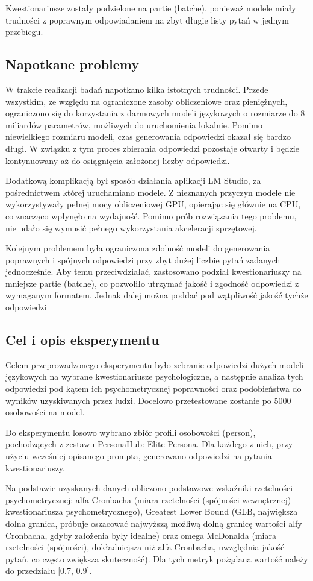 \documentclass{article}
\begin{document}
Kwestionariusze zostały podzielone na partie (batche), ponieważ modele miały trudności z poprawnym odpowiadaniem na zbyt długie listy pytań w jednym przebiegu.

\subsection{Napotkane problemy}
W trakcie realizacji badań napotkano kilka istotnych trudności. Przede wszystkim, ze względu na ograniczone zasoby obliczeniowe oraz pieniężnych, ograniczono się do korzystania z darmowych modeli językowych o rozmiarze do 8 miliardów parametrów, możliwych do uruchomienia lokalnie. Pomimo niewielkiego rozmiaru modeli, czas generowania odpowiedzi okazał się bardzo długi. W związku z tym proces zbierania odpowiedzi pozostaje otwarty i będzie kontynuowany aż do osiągnięcia założonej liczby odpowiedzi.

Dodatkową komplikacją był sposób działania aplikacji LM Studio, za pośrednictwem której uruchamiano modele. Z nieznanych przyczyn modele nie wykorzystywały pełnej mocy obliczeniowej GPU, opierając się głównie na CPU, co znacząco wpłynęło na wydajność. Pomimo prób rozwiązania tego problemu, nie udało się wymusić pełnego wykorzystania akceleracji sprzętowej.

Kolejnym problemem była ograniczona zdolność modeli do generowania poprawnych i spójnych odpowiedzi przy zbyt dużej liczbie pytań zadanych jednocześnie. Aby temu przeciwdziałać, zastosowano podział kwestionariuszy na mniejsze partie (batche), co pozwoliło utrzymać jakość i zgodność odpowiedzi z wymaganym formatem. Jednak dalej można poddać pod wątpliwość jakość tychże odpowiedzi

\subsection{Cel i opis eksperymentu}
Celem przeprowadzonego eksperymentu było zebranie odpowiedzi dużych modeli językowych na wybrane kwestionariusze psychologiczne, a następnie analiza tych odpowiedzi pod kątem ich psychometrycznej poprawności oraz podobieństwa do wyników uzyskiwanych przez ludzi. Docelowo przetestowane zostanie po 5000 osobowości na model.

Do eksperymentu losowo wybrano zbiór profili osobowości (person), pochodzących z zestawu PersonaHub: Elite Persona. Dla każdego z nich, przy użyciu wcześniej opisanego prompta, generowano odpowiedzi na pytania kwestionariuszy.

Na podstawie uzyskanych danych obliczono podstawowe wskaźniki rzetelności psychometrycznej: alfa Cronbacha (miara rzetelności (spójności wewnętrznej) kwestionariusza psychometrycznego), Greatest Lower Bound (GLB, największa dolna granica, próbuje oszacować najwyższą możliwą dolną granicę wartości alfy Cronbacha, gdyby założenia były idealne) oraz omega McDonalda (miara rzetelności (spójności), dokładniejsza niż alfa Cronbacha, uwzględnia jakość pytań, co często zwiększa skuteczność). Dla tych metryk pożądana wartość należy do przedziału [0.7, 0.9].
\end{document}
